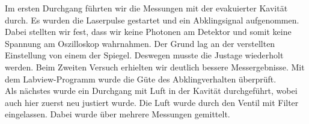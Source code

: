Im ersten Durchgang führten wir die Messungen mit der evakuierter Kavität durch. Es wurden die Laserpulse gestartet und ein Abklingsignal aufgenommen. Dabei stellten wir fest, dass wir keine Photonen am Detektor und somit keine Spannung am Oszilloskop wahrnahmen. Der Grund lag an der verstellten Einstellung von einem der Spiegel. Deswegen musste die Justage wiederholt werden. Beim Zweiten Versuch erhielten wir deutlich bessere Messergebnisse. Mit dem Labview-Programm wurde die Güte des Abklingverhalten überprüft.\\ 
Als nächstes wurde ein Durchgang mit Luft in der Kavität durchgeführt, wobei auch hier zuerst neu justiert wurde. Die Luft wurde durch den Ventil mit Filter eingelassen. Dabei wurde über mehrere Messungen gemittelt.


